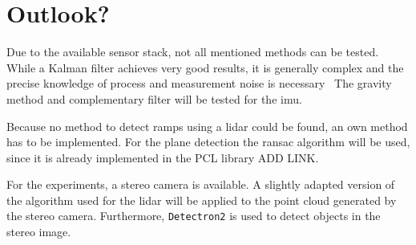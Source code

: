 \section{Outlook?}
Due to the available sensor stack, not all mentioned methods can be tested.
While a Kalman filter achieves very good results, it is generally complex and the precise knowledge of process and measurement noise is necessary~\cite{Higgins1975}
The gravity method and complementary filter will be tested for the \gls{imu}.

Because no method to detect ramps using a \gls{lidar} could be found, an own method has to be implemented.
For the plane detection the \gls{ransac} algorithm will be used, since it is already implemented in the PCL library ADD LINK.

For the experiments, a stereo camera is available.
A slightly adapted version of the algorithm used for the \gls{lidar} will be applied to the point cloud generated by the stereo camera.
Furthermore, \texttt{Detectron2} is used to detect objects in the stereo image.